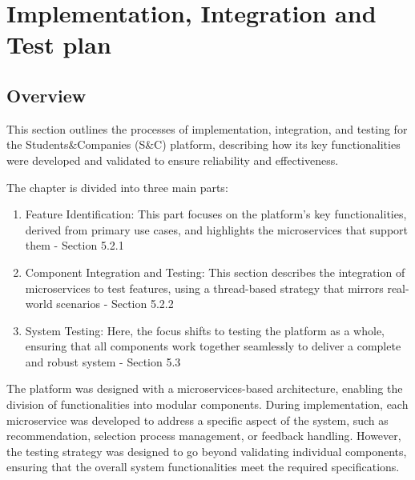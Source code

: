 \chapter{Implementation, Integration and Test plan}

\section{Overview}

This section outlines the processes of implementation, integration, and testing for the Students\&Companies
(S\&C) platform, describing how its key functionalities were developed and validated to ensure
reliability and effectiveness.

The chapter is divided into three main parts:

\begin{enumerate}
    \item Feature Identification: This part focuses on the platform's key functionalities, derived from
    primary use cases, and highlights the microservices that support them - Section 5.2.1
    \item Component Integration and Testing: This section describes the integration of microservices
    to test features, using a thread-based strategy that mirrors real-world scenarios - Section 5.2.2
    \item System Testing: Here, the focus shifts to testing the platform as a whole, ensuring that
    all components work together seamlessly to deliver a complete and robust system - Section 5.3
\end{enumerate}

The platform was designed with a microservices-based architecture, enabling the division
of functionalities into modular components. During implementation, each microservice was
developed to address a specific aspect of the system, such as recommendation, selection
process management, or feedback handling. However, the testing strategy was designed to go
beyond validating individual components, ensuring that the overall system functionalities
meet the required specifications.

